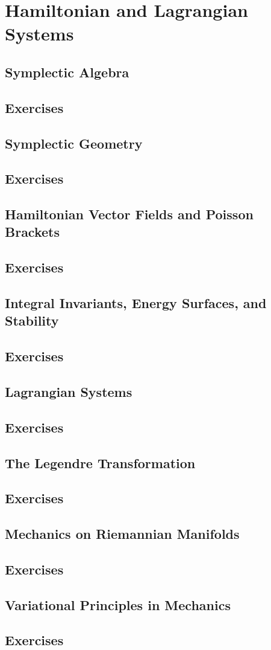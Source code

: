 \chapter{Hamiltonian and Lagrangian Systems}
\section{Symplectic Algebra}
\section*{Exercises}
\section{Symplectic Geometry}
\section*{Exercises}
\section{Hamiltonian Vector Fields and Poisson Brackets}
\section*{Exercises}
\section{Integral Invariants, Energy Surfaces, and Stability}
\section*{Exercises}
\section{Lagrangian Systems}
\section*{Exercises}
\section{The Legendre Transformation}
\section*{Exercises}
\section{Mechanics on Riemannian Manifolds}
\section*{Exercises}
\section{Variational Principles in Mechanics}
\section*{Exercises}

